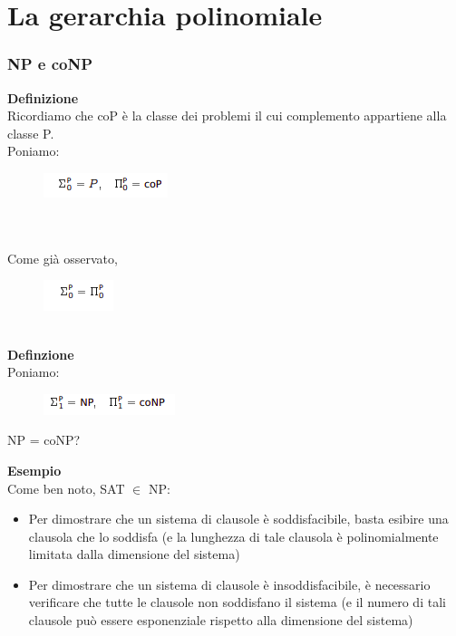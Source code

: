 \chapter{La gerarchia polinomiale} \label{ch:capitolo15}
\subsection{NP e coNP}
\textbf{Definizione}\\
Ricordiamo che coP è la classe dei problemi il cui complemento appartiene
alla classe P. 
\\Poniamo:
\begin{figure}[htp]
    \centering
    \includegraphics[scale=0.9]{tesi_stile/img/figura1cap15.png}
\end{figure}
\\\\Come già osservato,\\
\begin{figure}[htp]
    \centering
    \includegraphics[scale=0.9]{tesi_stile/img/foto2cap15.png}
\end{figure}
\\\textbf{Definzione}
\\Poniamo:\\
\begin{figure}[htp]
    \centering
    \includegraphics[scale=0.9]{tesi_stile/img/foto3cap15.png}
\end{figure}
\begin{center}
    NP = coNP?
\end{center}
\textbf{Esempio}\\
Come ben noto, SAT $\in$ NP:
\begin{itemize}
    \item Per dimostrare che un sistema di clausole è soddisfacibile, basta esibire una clausola che lo soddisfa (e la lunghezza di tale clausola è polinomialmente limitata dalla dimensione del sistema)
    
    \item Per dimostrare che un sistema di clausole è insoddisfacibile, è necessario verificare che tutte le clausole non soddisfano il sistema (e il numero di tali clausole può essere esponenziale rispetto alla dimensione del sistema)
\end{itemize}
